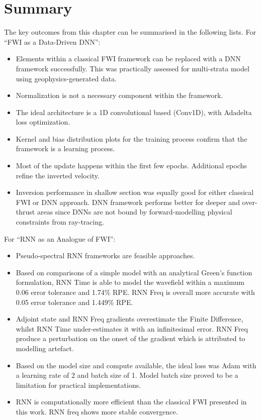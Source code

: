 {\clearpage
\section{Summary}
The key outcomes from this chapter can be summarised in the following lists. For ``FWI as a Data-Driven DNN'':
\begin{itemize}
    \item Elements within a classical FWI framework can be replaced with a DNN framework successfully. This was practically assessed for multi-strata model using geophysics-generated data.
    \item Normalization is not a necessary component within the framework.
    \item The ideal architecture is a 1D convolutional based (Conv1D), with Adadelta loss optimization.
    \item Kernel and bias distribution plots for the training process confirm that the framework is a learning process.
    \item Most of the update happens within the first few epochs. Additional epochs refine the inverted velocity.
    \item Inversion performance in shallow section was equally good for either classical FWI or DNN approach. DNN framework performs better for deeper and over-thrust areas since DNNs are not bound by forward-modelling physical constraints from ray-tracing.    
\end{itemize}
For ``RNN as an Analogue of FWI'':
\begin{itemize}
    \item Pseudo-spectral RNN frameworks are feasible approaches.
    \item Based on comparisons of a simple model with an analytical Green's function formulation, RNN Time is able to model the wavefield within a maximum 0.06 error tolerance and 1.74\% RPE. RNN Freq is overall more accurate with 0.05 error tolerance and 1.449\% RPE.
    \item Adjoint state and RNN Freq gradients overestimate the Finite Difference, whilst RNN Time under-estimates it with an infinitesimal error. RNN Freq produce a perturbation on the onset of the gradient which is attributed to modelling artefact.
    \item Based on the model size and compute available, the ideal loss was Adam with a learning rate of 2 and batch size of 1. Model batch size proved to be a limitation for practical implementations.
    \item RNN is computationally more efficient than the classical FWI presented in this work. RNN freq shows more stable convergence.

\end{itemize}}
